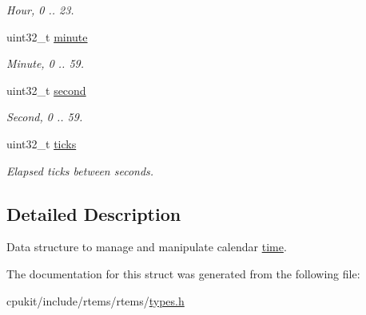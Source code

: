 \begin{DoxyCompactItemize}
\begin{DoxyCompactList}\small\item\em Hour, 0 .. 23. \end{DoxyCompactList}\item 
\mbox{\label{structrtems__time__of__day_a9011befa6e4c8208b00750f8fd0f3121}} 
uint32\+\_\+t \mbox{\hyperlink{structrtems__time__of__day_a9011befa6e4c8208b00750f8fd0f3121}{minute}}
\begin{DoxyCompactList}\small\item\em Minute, 0 .. 59. \end{DoxyCompactList}\item 
\mbox{\label{structrtems__time__of__day_aa0b6d8e3f560412003c361d0d4b5af28}} 
uint32\+\_\+t \mbox{\hyperlink{structrtems__time__of__day_aa0b6d8e3f560412003c361d0d4b5af28}{second}}
\begin{DoxyCompactList}\small\item\em Second, 0 .. 59. \end{DoxyCompactList}\item 
\mbox{\label{structrtems__time__of__day_a16b254c68228a9f18c0e684d66e00072}} 
uint32\+\_\+t \mbox{\hyperlink{structrtems__time__of__day_a16b254c68228a9f18c0e684d66e00072}{ticks}}
\begin{DoxyCompactList}\small\item\em Elapsed ticks between seconds. \end{DoxyCompactList}\end{DoxyCompactItemize}


\subsection{Detailed Description}
Data structure to manage and manipulate calendar \mbox{\hyperlink{group__RTEMSAPIClassic_ClassicRTEMSSecTime}{time}}. 

The documentation for this struct was generated from the following file\+:\begin{DoxyCompactItemize}
\item 
cpukit/include/rtems/rtems/\mbox{\hyperlink{cpukit_2include_2rtems_2rtems_2types_8h}{types.\+h}}\end{DoxyCompactItemize}
